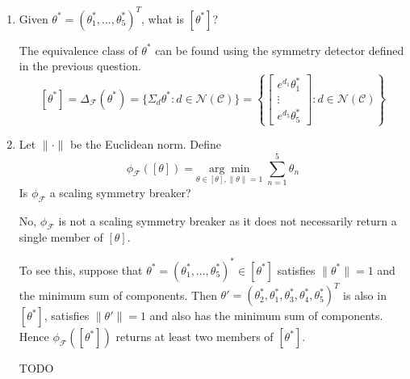\begin{enumerate}
\begin{enumerate}
\item
Given $\theta^*=(\theta_1^*,...,\theta_5^*)^T$, what is $[\theta^*]$?

\begin{solution}
The equivalence class of $\theta^*$ can be found using the symmetry detector defined in the previous question.
\[
[\theta^*] = \Delta_\mathcal{F}(\theta^*) = \{\Sigma_d\theta^*:d\in\mathcal{N}(\mathcal{C})\} = \left\{
\begin{bmatrix}
e^{d_1}\theta_1^* \\
\vdots \\
e^{d_5}\theta_5^*
\end{bmatrix}
:
d\in\mathcal{N}(\mathcal{C})
\right\}
\]
\end{solution}

\item
Let $\|\cdot\|$ be the Euclidean norm. Define
\[
\phi_\mathcal{F}([\theta])=\underset{\theta\in[\theta],\|\theta\|=1}{\arg\min}\;\sum_{n=1}^5\theta_n
\]
Is $\phi_\mathcal{F}$ a scaling symmetry breaker?

\begin{solution}
No, $\phi_\mathcal{F}$ is not a scaling symmetry breaker as it does not necessarily return a single member of $[\theta]$.

To see this, suppose that $\theta^*=(\theta_1^*,...,\theta_5^*)^*\in[\theta^*]$ satisfies $\|\theta^*\|=1$ and the minimum sum of components. Then $\theta'=(\theta_2^*,\theta_1^*,\theta_3^*,\theta_4^*,\theta_5^*)^T$ is also in $[\theta^*]$, satisfies $\|\theta'\|=1$ and also has the minimum sum of components. Hence $\phi_\mathcal{F}([\theta^*])$ returns at least two members of $[\theta^*]$.

TODO
\end{solution}

\end{enumerate}

\end{enumerate}